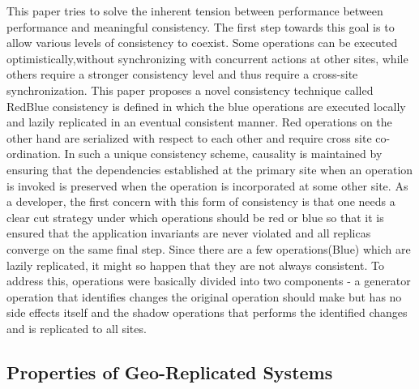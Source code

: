 \documentclass[12pt]{article}
\theoremstyle{plain}
\theoremstyle{definition}
\theoremstyle{remark}
\begin{document}
This paper tries to solve the inherent tension between performance between performance and meaningful consistency. The first step towards this goal is to allow various levels of consistency to coexist. Some operations can be executed optimistically,without synchronizing with concurrent actions at other sites, while others require a stronger consistency level and thus require a cross-site synchronization. This paper proposes a novel consistency technique called RedBlue consistency is defined in which the blue operations are executed locally and lazily replicated in an eventual consistent manner. Red operations on the other hand are serialized with respect to each other and require cross site co-ordination. In such a unique consistency scheme, causality is maintained by ensuring that the dependencies established at the primary site when an operation is invoked is preserved when the operation is incorporated at some other site. As a developer, the first concern with this form of consistency is that one needs a clear cut strategy under which operations should be red or blue so that it is ensured that the application invariants are never violated and all replicas converge on the same final step. Since there are a few operations(Blue) which are lazily replicated, it might so happen that they are not always consistent. To address this, operations were basically divided into two components - a generator operation that identifies changes the original operation should make but has no side effects itself and the shadow operations that performs the identified changes and is replicated to all sites.


\subsection*{Properties of Geo-Replicated Systems}
\end{document}
